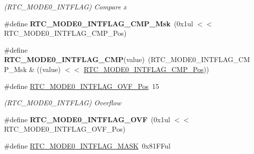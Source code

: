 \begin{DoxyCompactItemize}
\begin{DoxyCompactList}\small\item\em (R\+T\+C\+\_\+\+M\+O\+D\+E0\+\_\+\+I\+N\+T\+F\+L\+A\+G) Compare x \end{DoxyCompactList}\item 
\hypertarget{group___s_a_m_l21___r_t_c_ga24ffecb21146e238ec0af4f59a45bacd}{}\#define {\bfseries R\+T\+C\+\_\+\+M\+O\+D\+E0\+\_\+\+I\+N\+T\+F\+L\+A\+G\+\_\+\+C\+M\+P\+\_\+\+Msk}~(0x1ul $<$$<$ R\+T\+C\+\_\+\+M\+O\+D\+E0\+\_\+\+I\+N\+T\+F\+L\+A\+G\+\_\+\+C\+M\+P\+\_\+\+Pos)\label{group___s_a_m_l21___r_t_c_ga24ffecb21146e238ec0af4f59a45bacd}

\item 
\hypertarget{group___s_a_m_l21___r_t_c_ga383c9e957b79ae56d59b934d4bdbce0b}{}\#define {\bfseries R\+T\+C\+\_\+\+M\+O\+D\+E0\+\_\+\+I\+N\+T\+F\+L\+A\+G\+\_\+\+C\+M\+P}(value)~(R\+T\+C\+\_\+\+M\+O\+D\+E0\+\_\+\+I\+N\+T\+F\+L\+A\+G\+\_\+\+C\+M\+P\+\_\+\+Msk \& ((value) $<$$<$ \hyperlink{group___s_a_m_l21___r_t_c_gac0320bb38db6d1e4ae60040c73789f33}{R\+T\+C\+\_\+\+M\+O\+D\+E0\+\_\+\+I\+N\+T\+F\+L\+A\+G\+\_\+\+C\+M\+P\+\_\+\+Pos}))\label{group___s_a_m_l21___r_t_c_ga383c9e957b79ae56d59b934d4bdbce0b}

\item 
\hypertarget{group___s_a_m_l21___r_t_c_ga01417194caf475e80349627072678ad0}{}\#define \hyperlink{group___s_a_m_l21___r_t_c_ga01417194caf475e80349627072678ad0}{R\+T\+C\+\_\+\+M\+O\+D\+E0\+\_\+\+I\+N\+T\+F\+L\+A\+G\+\_\+\+O\+V\+F\+\_\+\+Pos}~15\label{group___s_a_m_l21___r_t_c_ga01417194caf475e80349627072678ad0}

\begin{DoxyCompactList}\small\item\em (R\+T\+C\+\_\+\+M\+O\+D\+E0\+\_\+\+I\+N\+T\+F\+L\+A\+G) Overflow \end{DoxyCompactList}\item 
\hypertarget{group___s_a_m_l21___r_t_c_ga7ac08d7468256f866ee351abefb7820f}{}\#define {\bfseries R\+T\+C\+\_\+\+M\+O\+D\+E0\+\_\+\+I\+N\+T\+F\+L\+A\+G\+\_\+\+O\+V\+F}~(0x1ul $<$$<$ R\+T\+C\+\_\+\+M\+O\+D\+E0\+\_\+\+I\+N\+T\+F\+L\+A\+G\+\_\+\+O\+V\+F\+\_\+\+Pos)\label{group___s_a_m_l21___r_t_c_ga7ac08d7468256f866ee351abefb7820f}

\item 
\hypertarget{group___s_a_m_l21___r_t_c_ga0cc674fa7bbea27821c8792667137bbb}{}\#define \hyperlink{group___s_a_m_l21___r_t_c_ga0cc674fa7bbea27821c8792667137bbb}{R\+T\+C\+\_\+\+M\+O\+D\+E0\+\_\+\+I\+N\+T\+F\+L\+A\+G\+\_\+\+M\+A\+S\+K}~0x81\+F\+Ful\label{group___s_a_m_l21___r_t_c_ga0cc674fa7bbea27821c8792667137bbb}


\end{DoxyCompactItemize}
